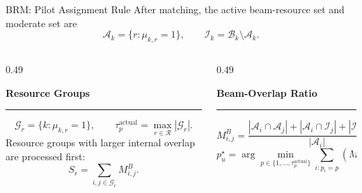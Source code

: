\documentclass[aspectratio=169, 10pt]{beamer}
\newcommand{\tauactual}{\tau_p^{\mathrm{actual}}}
\newcommand{\slideheading}[1]{%
    \par\vspace{0.08cm}%
    \settowidth{\dimen0}{\bfseries\large #1}%
    {\bfseries\large #1}%
    \par\vspace{0.015cm}%
    {\color{black}\rule{\dimen0}{0.7pt}}%
    \par\vspace{0.16cm}%
}
\begin{document}
\begin{frame}[label=main-pilot-rule]{BRM: Pilot Assignment Rule}
    \small
    After matching, the active beam-resource set and moderate set are
    \[
        \mathcal{A}_k
        =
        \{r:\mu_{k,r}=1\},
        \qquad
        \mathcal{I}_k
        =
        \mathcal{B}_k\setminus\mathcal{A}_k.
    \]

    \begin{columns}[T,onlytextwidth]
        \begin{column}{0.49\textwidth}
            \slideheading{Resource Groups}
            \[
                \mathcal{G}_r
                =
                \{k:\mu_{k,r}=1\},
                \qquad
                \tauactual
                =
                \max_{r\in\mathcal{R}}|\mathcal{G}_r|.
            \]
            Resource groups with larger internal overlap are processed first:
            \[
                S_r
                =
                \sum_{i,j\in\mathcal{G}_r}
                M_{i,j}^{B}.
            \]
        \end{column}
        \begin{column}{0.49\textwidth}
            \slideheading{Beam-Overlap Ratio}
            \[
                M_{i,j}^{B}
                =
                \frac{
                |\mathcal{A}_i\cap\mathcal{A}_j|
                +
                |\mathcal{A}_i\cap\mathcal{I}_j|
                +
                |\mathcal{I}_i\cap\mathcal{A}_j|
                }{
                |\mathcal{A}_i|
                }.
            \]
            \[
                p_u^\star
                =
                \arg\min_{p\in\{1,\ldots,\tauactual\}}
                \sum_{i:p_i=p}
                \left(M_{u,i}^{B}+M_{i,u}^{B}\right).
            \]
        \end{column}
    \end{columns}

    \begin{flushright}
        \hyperlink{app-brm-flow}{}
    \end{flushright}
\end{frame}
\end{document}
